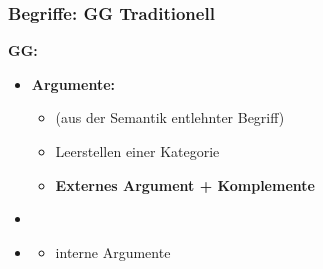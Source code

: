 \begin{frame}
\frametitle{Begriffe: GG \vs Traditionell}

\begin{minipage}[b]{0.47\textwidth}

	\textbf{GG:}

	\begin{itemize}
		\item \textbf{Argumente:}
		\begin{itemize}
			\item (aus der Semantik entlehnter Begriff)
			
			\item Leerstellen einer Kategorie 
			
			\item \textbf{Externes Argument + Komplemente}
		\end{itemize}
		
		\item[]
		
		\item {}
		\begin{itemize}
			\item interne Argumente
		\end{itemize}
		
	\end{itemize}	
\end{minipage}  
\begin{minipage}[b]{0.48\textwidth}
	\begin{figure}
	\centering

	\end{figure}
\end{minipage}

\end{frame}


